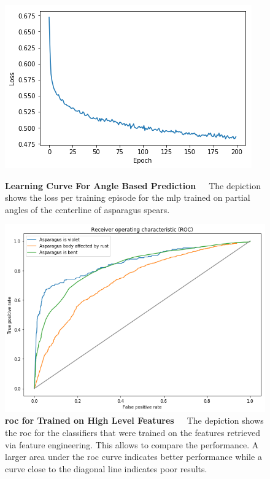 \begin{figure}[!htb]
	\centering
	\includegraphics[scale=0.7]{Figures/chapter04/fe_curve.png}
	\decoRule
	\caption[Feature Engineering Learning Curve For Angle Based Prediction]{\textbf{Learning Curve For Angle Based Prediction}~~~The depiction shows the loss per training episode for the \acrshort{mlp} trained on partial angles of the centerline of asparagus spears.}
	\label{fig:FeatureEngineeringCurve}
	\vspace{2cm}
	\centering
	\includegraphics[scale=0.6]{Figures/chapter04/fe_roc.png}
	\caption[Feature Engineering ROC for MLPs Trained on High Level Features]{\textbf{\acrshort{roc} for  Trained on High Level Features}~~~The depiction shows the \acrfull{roc} for the classifiers that were trained on the features retrieved via feature engineering. This allows to compare the performance. A larger area under the \acrshort{roc} curve indicates better performance while a curve close to the diagonal line indicates poor results.}
	\label{fig:FeatureEngineeringROC}
\end{figure}

